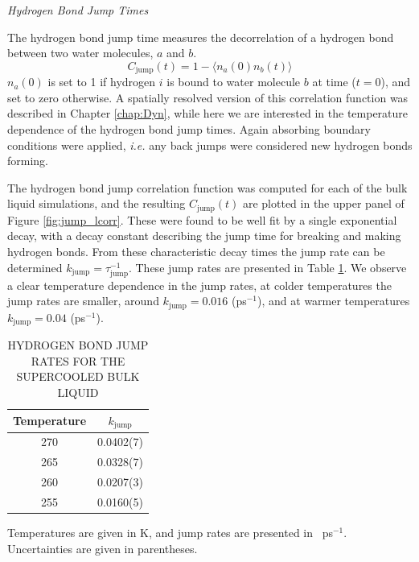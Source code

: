 \begin{flushleft}
\textit{Hydrogen Bond Jump Times}
\end{flushleft}
The hydrogen bond jump time measures the decorrelation of a hydrogen
bond between two water molecules, $a$ and $b$. 
\begin{equation}\label{jump}
C_\mathrm{jump}(t) = 1 - \langle n_a(0) n_b(t) \rangle
\end{equation}
$n_a(0)$ is set to 1 if hydrogen $i$ is bound to water molecule $b$ at
time ($t=0$), and set to zero otherwise. A spatially resolved version
of this correlation function was described in Chapter \ref{chap:Dyn},
while here we are interested in the temperature dependence of the
hydrogen bond jump times. Again absorbing boundary conditions were
applied, \textit{i.e.} any back jumps were considered new hydrogen
bonds forming.

The hydrogen bond jump correlation function was computed for each of
the bulk liquid simulations, and the resulting $C_\mathrm{jump}(t)$
are plotted in the upper panel of Figure \ref{fig:jump_lcorr}. These
were found to be well fit by a single exponential decay, with a decay
constant describing the jump time for breaking and making hydrogen
bonds. From these characteristic decay times the jump rate can be
determined $k_\mathrm{jump} = \tau_\mathrm{jump}^{-1}$. These jump
rates are presented in Table \ref{tab:bulkJump}. We observe a clear
temperature dependence in the jump rates, at colder temperatures the
jump rates are smaller, around $k_\mathrm{jump} = 0.016$ (ps$^{-1}$),
and at warmer temperatures $k_\mathrm{jump} = 0.04$ (ps$^{-1}$).

\begin{table}[h] \centering \caption{HYDROGEN BOND JUMP RATES FOR THE
    SUPERCOOLED BULK LIQUID\label{tab:bulkJump}}
\begin{tabular}{cc}
\hline
\hline
 Temperature & $k_\mathrm{jump}$ \\
\hline
270 & 0.0402(7) \\
265 & 0.0328(7) \\
260 & 0.0207(3)  \\
255 & 0.0160(5) \\
\hline
\hline
\end{tabular}
\begin{flushleft}
  Temperatures are given in K, and jump rates are presented in
  ~ps$^{-1}$. Uncertainties are given in parentheses.
\end{flushleft}
\end{table}


